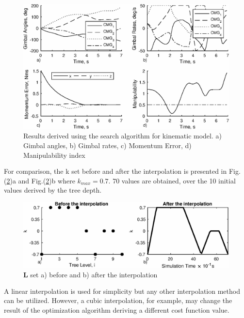 \documentclass[journal]{new-aiaa}
\begin{document}
\begin{figure}[H]
\centering
\includegraphics[width=6in]{kinwithtest.eps}
\caption{Results derived using the search algorithm for kinematic model. a) Gimbal angles, b) Gimbal rates, c) Momentum Error, d) Manipulability index}
\label{fig:kin1}
\end{figure}

For comparison, the k set before and after the interpolation is presented in Fig.(\ref{fig:kset})a and Fig.(\ref{fig:kset})b where $k_{max}=0.7$. 70 values are obtained, over the 10 initial values derived by the tree depth. 
\begin{figure}[H]
\centering
\includegraphics[width=6in]{ksettest2.eps}
\caption{\textbf{L} set a) before and b) after the interpolation}
\label{fig:kset}
\end{figure}
A linear interpolation is used for simplicity but any other interpolation method can be utilized. However, a cubic interpolation, for example, may change the result of the optimization algorithm deriving a different cost function value.
\end{document}
